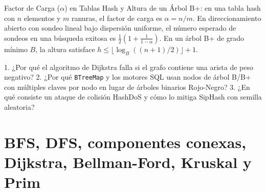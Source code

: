 \documentclass{book}
\begin{document}
\begin{tcolorbox}[title={Definición}, studiumdef, breakable]

Factor de Carga (\(\alpha\)) en Tablas Hash y Altura de un Árbol B+: en una tabla hash con \(n\) elementos y \(m\) ranuras, el factor de carga es \(\alpha = n / m\). En direccionamiento abierto con sondeo lineal bajo dispersión uniforme, el número esperado de sondeos en una búsqueda exitosa es \(\frac{1}{2}\left(1 + \frac{1}{1 - \alpha}\right)\). En un árbol B+ de grado mínimo \(B\), la altura satisface \(h \le \lfloor \log_B((n+1)/2) \rfloor + 1\).
\end{tcolorbox}

\begin{tcolorbox}[title={Autoficha}, studiumcheck, breakable]

1. ¿Por qué el algoritmo de Dijkstra falla si el grafo contiene una arista de peso negativo? 2. ¿Por qué \texttt{BTreeMap} y los motores SQL usan nodos de árbol B/B+ con múltiples claves por nodo en lugar de árboles binarios Rojo-Negro? 3. ¿En qué consiste un ataque de colisión HashDoS y cómo lo mitiga SipHash con semilla aleatoria?
\end{tcolorbox}

\section{BFS, DFS, componentes conexas, Dijkstra, Bellman-Ford, Kruskal y Prim}
\end{document}
